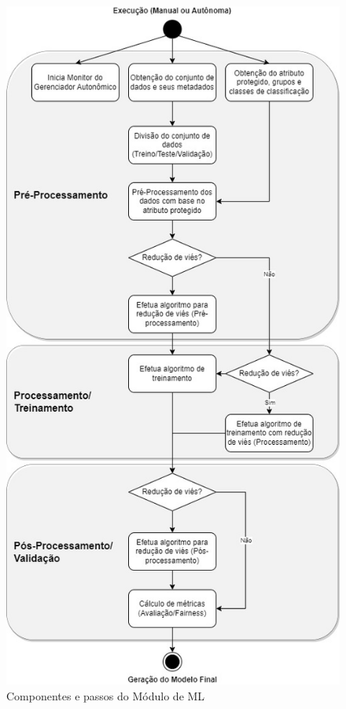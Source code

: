 \documentclass[portugues]{ic-tese}
\begin{document}
\begin{figure}[H]
\centering
\includegraphics[scale=0.45]{images/ml-fairness-pipeline.jpg}
\caption {Componentes e passos do Módulo de ML}
\label{fig:FairnessPipeline}
\end{figure}
\end{document}
